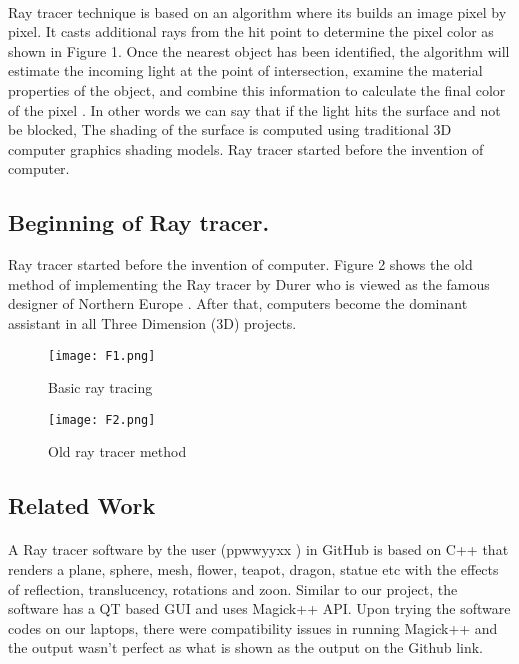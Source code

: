 \documentclass{article}
\begin{document}
\paragraph{}
Ray tracer technique is based on an algorithm where its builds an image pixel by pixel. It casts additional rays from the hit point to determine the pixel color as shown in Figure 1.
Once the nearest object has been identified, the algorithm will estimate the incoming light at the point of intersection, examine the material properties of the object, and combine this information to calculate the final color of the pixel \cite{2}. In other words we can say that if the light hits the surface and not be blocked,  The shading of the surface is computed using traditional 3D computer graphics shading models. 
Ray tracer started before the invention of computer. 


\subsection{Beginning of Ray tracer.} 
Ray tracer started before the invention of computer. Figure 2 shows the old method of implementing the Ray tracer by Durer who is viewed as the famous designer of Northern Europe \cite{6}. After that, computers become the dominant assistant in all Three Dimension (3D) projects.

\begin{figure}
    \centering
    \texttt{[image: F1.png]}
    \caption{Basic ray tracing}
    \label{figure1}
\end{figure}

\begin{figure}[!h]
\centering
\texttt{[image: F2.png]}
\caption{Old ray tracer method \label{fig2}}
\end{figure}

\subsection{Related Work}
\paragraph{}
A Ray tracer software by the user (ppwwyyxx ) in GitHub is based on C++ that renders a plane, sphere, mesh, flower, teapot, dragon, statue etc with the effects of reflection, translucency, rotations and zoon. Similar to our project, the software has a QT based GUI and uses Magick++ API. Upon trying the software codes on our laptops, there were compatibility issues in running Magick++ and the output wasn't perfect as what is shown as the output on the Github link. \cite{7}
\end{document}
